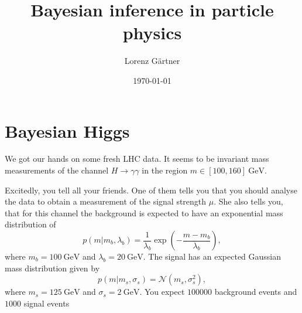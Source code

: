 \documentclass{article}
\title{Bayesian inference in particle physics}
\author{Lorenz G\"artner}
\date{\today}
\begin{document}
\maketitle


\section*{Bayesian Higgs}
We got our hands on some fresh LHC data. It seems to be invariant mass measurements of the channel $H\to \gamma \gamma$ in the region $m \in [100, 160]~\mathrm{GeV}$.

Excitedly, you tell all your friends. One of them tells you that you should analyse the data to obtain a measurement of the signal strength $\mu$. She also tells you, that for this channel the background is expected to have an exponential mass distribution of
$$p(m|m_b, \lambda_b) =\frac{1}{\lambda_b} \exp\left(-\frac{m-m_b}{\lambda_b}\right),$$
where $m_b=100~\mathrm{GeV}$ and  $\lambda_b=20~\mathrm{GeV}$. The signal has an expected Gaussian mass distribution given by
$$p(m|m_s, \sigma_s) = \mathcal{N}(m_s, \sigma_s^2),$$
where $m_s=125~\mathrm{GeV}$ and $\sigma_s=2~\mathrm{GeV}$. You expect $100000$ background events and $1000$ signal events
\end{document}

